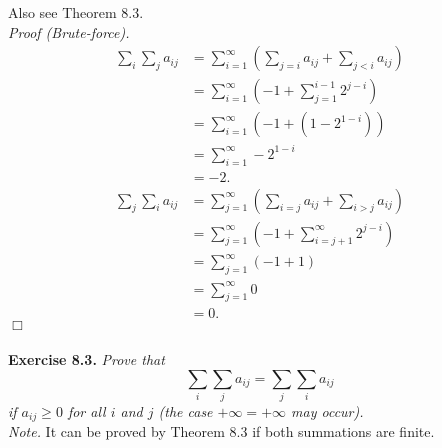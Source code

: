 \documentclass{article}
\begin{document}
Also see Theorem 8.3. \\

\emph{Proof (Brute-force).}
\begin{align*}
  \sum_{i} \sum_{j} a_{ij}
  &= \sum_{i=1}^{\infty} \left( \sum_{j = i} a_{ij} + \sum_{j < i} a_{ij} \right) \\
  &= \sum_{i=1}^{\infty} \left( -1 + \sum_{j=1}^{i-1} 2^{j-i} \right) \\
  &= \sum_{i=1}^{\infty} ( -1 + (1 - 2^{1-i}) ) \\
  &= \sum_{i=1}^{\infty} -2^{1-i} \\
  &= -2.
\end{align*}
\begin{align*}
  \sum_{j} \sum_{i} a_{ij}
  &= \sum_{j=1}^{\infty} \left( \sum_{i = j} a_{ij} + \sum_{i > j} a_{ij} \right) \\
  &= \sum_{j=1}^{\infty} \left( -1 + \sum_{i=j+1}^{\infty} 2^{j-i} \right) \\
  &= \sum_{j=1}^{\infty} ( -1 + 1 ) \\
  &= \sum_{j=1}^{\infty} 0 \\
  &= 0.
\end{align*}
$\Box$ \\\\






\textbf{Exercise 8.3.}
\emph{Prove that
\[
  \sum_{i} \sum_{j} a_{ij} = \sum_{j} \sum_{i} a_{ij}
\]
if $a_{ij} \geq 0$ for all $i$ and $j$ (the case $+\infty = +\infty$ may occur).} \\

\emph{Note.}
It can be proved by Theorem 8.3 if both summations are finite. \\
\end{document}
